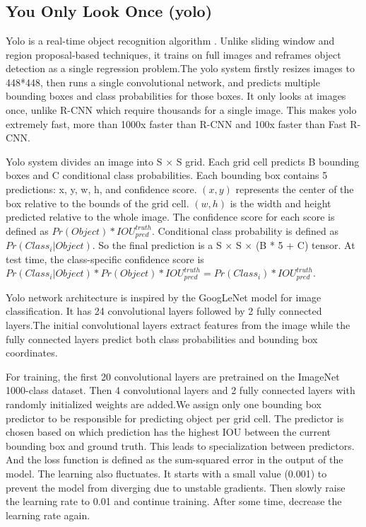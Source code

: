 \section{}

\subsection{You Only Look Once (yolo)}
Yolo is a real-time object recognition algorithm \cite{yolo}. Unlike sliding window and region proposal-based techniques, it trains on full images and reframes object detection as a single regression problem.The yolo system firstly resizes images to 448*448, then runs a single convolutional network, and predicts multiple bounding boxes and class probabilities for those boxes. It only looks at images once, unlike R-CNN which require thousands for a single image. This makes yolo extremely fast, more than 1000x faster than R-CNN and 100x faster than Fast R-CNN. 


Yolo system divides an image into S × S grid. Each grid cell predicts B bounding boxes and C conditional class probabilities. Each bounding box contains 5 predictions: x, y, w, h, and confidence score. $(x, y)$ represents the center of the box relative to the bounds of the grid cell. $(w, h)$ is the width and height predicted relative to the whole image. The confidence score for each score is defined as $Pr(Object) * IOU_{pred}^{truth}$. Conditional class probability is defined as $Pr({Class_{i}}|Object)$. So the final prediction is a S × S × (B * 5 + C) tensor. At test time, the class-specific confidence score is $Pr({Class_{i}}|Object) * Pr(Object) * IOU_{pred}^{truth} = Pr({Class_{i}}) * IOU_{pred}^{truth}$.

Yolo network architecture is inspired by the GoogLeNet model for image classification. It has 24 convolutional layers followed by 2 fully connected layers.The initial convolutional layers extract features from the image while the fully connected layers predict both class probabilities and bounding box coordinates.

For training, the first 20 convolutional layers are pretrained on the ImageNet 1000-class dataset. Then 4 convolutional layers and 2 fully connected layers with randomly initialized weights are added.We assign only one bounding box predictor to be responsible for predicting object per grid cell. The predictor is chosen based on which prediction has the highest IOU between the current bounding box and ground truth. This leads to specialization between predictors. And the loss function is defined as the sum-squared error in the output of the model. The learning also fluctuates. It starts with a small value (0.001) to prevent the model from diverging due to unstable gradients. Then slowly raise the learning rate to 0.01 and continue training. After some time, decrease the learning rate again.

